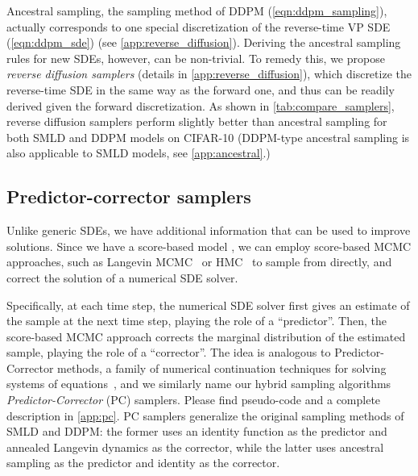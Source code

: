 \documentclass{article} \usepackage{iclr2021_conference,times}
\begin{document}
Ancestral sampling, the sampling method of DDPM (\cref{eqn:ddpm_sampling}), actually corresponds to one special discretization of the reverse-time VP SDE (\cref{eqn:ddpm_sde}) (see \cref{app:reverse_diffusion}). Deriving the ancestral sampling rules for new SDEs, however, can be non-trivial. To remedy this, we propose \emph{reverse diffusion samplers} (details in \cref{app:reverse_diffusion}), which discretize the reverse-time SDE in the same way as the forward one, and thus can be readily derived given the forward discretization.
As shown in \cref{tab:compare_samplers}, reverse diffusion samplers perform slightly better than ancestral sampling for both SMLD and DDPM models on CIFAR-10 (DDPM-type ancestral sampling is also applicable to SMLD models, see \cref{app:ancestral}.)


\subsection{Predictor-corrector samplers}
Unlike generic SDEs, we have additional information that can be used to improve solutions. Since we have a score-based model , we can employ score-based MCMC approaches, such as Langevin MCMC~\citep{parisi1981correlation,grenander1994representations} or HMC~\citep{neal2011mcmc} to sample from  directly, and correct the solution of a numerical SDE solver. 

Specifically, at each time step, the numerical SDE solver first gives an estimate of the sample at the next time step, playing the role of a ``predictor''. Then, the score-based MCMC approach corrects the 
marginal distribution of the estimated sample, playing the role of a ``corrector''. The idea is analogous to Predictor-Corrector methods, a family of numerical continuation techniques for solving systems of equations~\citep{allgower2012numerical}, and we similarly name our hybrid sampling algorithms \emph{Predictor-Corrector} (PC) samplers. Please find pseudo-code and a complete description in \cref{app:pc}. PC samplers generalize the original sampling methods of SMLD and DDPM: the former uses an identity function as the predictor and annealed Langevin dynamics as the corrector, while the latter uses ancestral sampling as the predictor and identity as the corrector. 
\end{document}
